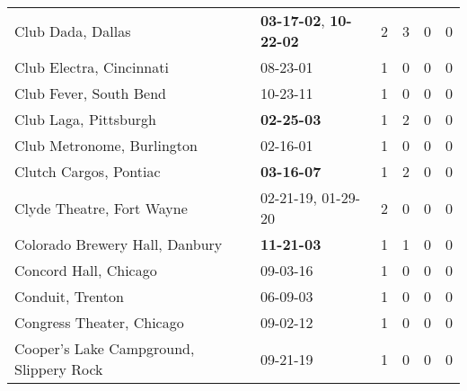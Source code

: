 \begin{longtable}{p{}p{}p{}p{}p{}p{}}
                                                            Club Dada, Dallas &  \textbf{03-17-02\textsuperscript{}}, \textbf{10-22-02\textsuperscript{}} &  2 &  3 &  0 &  0 \\
                                                     Club Electra, Cincinnati &                                                08-23-01\textsuperscript{} &  1 &  0 &  0 &  0 \\
                                                       Club Fever, South Bend &                                                10-23-11\textsuperscript{} &  1 &  0 &  0 &  0 \\
                                                        Club Laga, Pittsburgh &                                       \textbf{02-25-03\textsuperscript{}} &  1 &  2 &  0 &  0 \\
                                                   Club Metronome, Burlington &                                                02-16-01\textsuperscript{} &  1 &  0 &  0 &  0 \\
                                                       Clutch Cargos, Pontiac &                                       \textbf{03-16-07\textsuperscript{}} &  1 &  2 &  0 &  0 \\
                                                    Clyde Theatre, Fort Wayne &                    02-21-19\textsuperscript{}, 01-29-20\textsuperscript{} &  2 &  0 &  0 &  0 \\
                                               Colorado Brewery Hall, Danbury &                                       \textbf{11-21-03\textsuperscript{}} &  1 &  1 &  0 &  0 \\
                                                        Concord Hall, Chicago &                                                09-03-16\textsuperscript{} &  1 &  0 &  0 &  0 \\
                                                             Conduit, Trenton &                                                06-09-03\textsuperscript{} &  1 &  0 &  0 &  0 \\
                                                    Congress Theater, Chicago &                                                09-02-12\textsuperscript{} &  1 &  0 &  0 &  0 \\
                                      Cooper's Lake Campground, Slippery Rock &                                                09-21-19\textsuperscript{} &  1 &  0 &  0 &  0 \\

\end{longtable}
